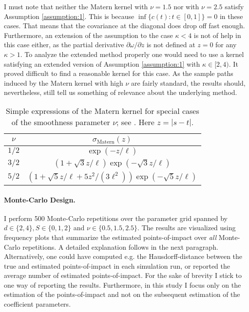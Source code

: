 \smallskip

\begin{remark}
I must note that neither the Matern kernel with $\nu = 1.5$ nor with $\nu = 2.5$ satisfy
Assumption \ref{assumption:1}. This is because $\inf \{ c(t) : t \in [0, 1] \} = 0$ in
these cases. That means that the covariance at the diagonal does drop off fast enough.
Furthermore, an extension of the assumption to the case $\kappa < 4$ is not of help in
this case either, as the partial derivative $\partial \omega / \partial z$ is not
defined at $z = 0$ for any $\kappa > 1$. To analyze the extended method properly one
would need to use a kernel satisfying an extended version of Assumption
\ref{assumption:1} with $\kappa \in [2, 4)$. It proved difficult to find a reasonable
kernel for this case. As the sample paths induced by the Matern kernel with high $\nu$
are fairly standard, the results should, nevertheless, still tell us something of
relevance about the underlying method.
\end{remark}


\begin{table}
    \renewcommand{\arraystretch}{2}
    \centering
    \begin{tabular}{c|c}
        $\nu$ & $\sigma_{\text{Matern}}(z)$ \\ \hline
        $1/2$ & $\exp \left( - z / \ell \right)$\\
        $3/2$ & $\left(1 + \sqrt{3} z / \ell \right)\exp \left( - \sqrt{3}z / \ell \right)$\\
        $5/2$ & $\left(1 + \sqrt{5} z / \ell + 5z^2 / (3\ell^2) \right)\exp \left( -
        \sqrt{5}z / \ell \right)$
    \end{tabular}
    \caption{Simple expressions of the Matern kernel for special cases of the smoothness
    parameter $\nu$; see \cite{Rasmussen2006}. Here $z = |s - t|$.}
    \label{table:matern_kernel}
\end{table}



\paragraph{Monte-Carlo Design.}

I perform 500 Monte-Carlo repetitions over the parameter grid spanned by $d \in \{2, 4\},
S \in \{0, 1, 2\}$ and $\nu \in \{0.5, 1.5, 2.5\}$. The results are visualized using
frequency plots that summarize the estimated points-of-impact over \emph{all}
Monte-Carlo repetitions. A detailed explanation follows in the next paragraph.
Alternatively, one could have computed e.g. the Hausdorff-distance between the true and
estimated points-of-impact in each simulation run, or reported the average number of
estimated points-of-impact. For the sake of brevity I stick to one way of reporting the
results. Furthermore, in this study I focus only on the estimation of the
points-of-impact and not on the subsequent estimation of the coefficient parameters.


